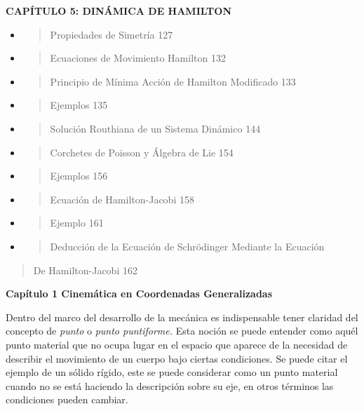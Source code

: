 \documentclass[]{article}
\begin{document}
\textbf{CAPÍTULO 5: DINÁMICA DE HAMILTON}

\begin{itemize}
\item
  \begin{quote}
  Propiedades de Simetría 127
  \end{quote}
\item
  \begin{quote}
  Ecuaciones de Movimiento Hamilton 132
  \end{quote}
\item
  \begin{quote}
  Principio de Mínima Acción de Hamilton Modificado 133
  \end{quote}
\item
  \begin{quote}
  Ejemplos 135
  \end{quote}
\item
  \begin{quote}
  Solución Routhiana de un Sistema Dinámico 144
  \end{quote}
\item
  \begin{quote}
  Corchetes de Poisson y Álgebra de Lie 154
  \end{quote}
\item
  \begin{quote}
  Ejemplos 156
  \end{quote}
\item
  \begin{quote}
  Ecuación de Hamilton-Jacobi 158
  \end{quote}
\item
  \begin{quote}
  Ejemplo 161
  \end{quote}
\item
  \begin{quote}
  Deducción de la Ecuación de Schrödinger Mediante la Ecuación
  \end{quote}
\end{itemize}

\begin{quote}
De Hamilton-Jacobi 162
\end{quote}

\textbf{Capítulo 1 Cinemática en Coordenadas Generalizadas}

Dentro del marco del desarrollo de la mecánica es indispensable tener
claridad del concepto de \emph{punto} o \emph{punto puntiforme.} Esta
noción se puede entender como aquél punto material que no ocupa lugar en
el espacio que aparece de la necesidad de describir el movimiento de un
cuerpo bajo ciertas condiciones. Se puede citar el ejemplo de un sólido
rígido, este se puede considerar como un punto material cuando no se
está haciendo la descripción sobre su eje, en otros términos las
condiciones pueden cambiar.
\end{document}

